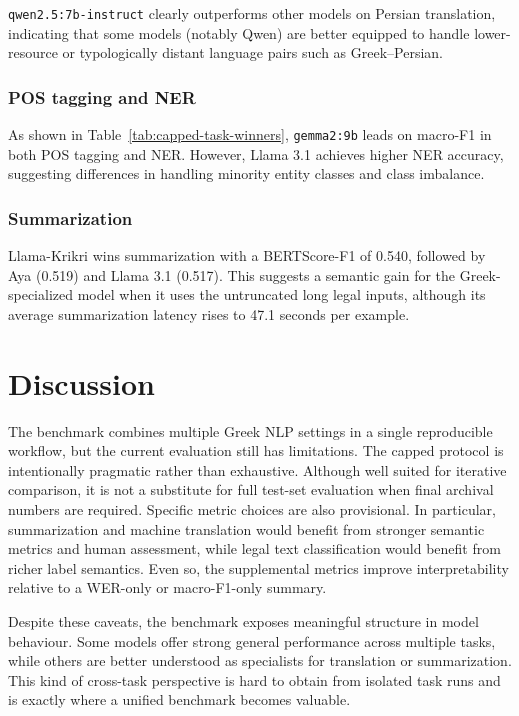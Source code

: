 \documentclass[sigconf,review,anonymous]{acmart}
\begin{document}
\texttt{qwen2.5:7b-instruct} clearly outperforms other models on Persian translation, indicating that some models (notably Qwen) are better equipped to handle lower-resource or typologically distant language pairs such as Greek–Persian.

\subsubsection{POS tagging and NER}
As shown in Table~\ref{tab:capped-task-winners}, \texttt{gemma2:9b} leads on macro-F1 in both POS tagging and NER. However, Llama 3.1 achieves higher NER accuracy, suggesting differences in handling minority entity classes and class imbalance.

\subsubsection{Summarization} Llama-Krikri wins summarization with a BERTScore-F1 of 0.540, followed by Aya (0.519) and Llama 3.1 (0.517). This suggests a semantic gain for the Greek-specialized model when it uses the untruncated long legal inputs, although its average summarization latency rises to 47.1 seconds per example.

\section{Discussion}
The benchmark combines multiple Greek NLP settings in a single reproducible workflow, but the current evaluation still has limitations. The capped protocol is intentionally pragmatic rather than exhaustive. Although well suited for iterative comparison, it is not a substitute for full test-set evaluation when final archival numbers are required. Specific metric choices are also provisional. In particular, summarization and machine translation would benefit from stronger semantic metrics and human assessment, while legal text classification would benefit from richer label semantics. Even so, the supplemental metrics improve interpretability relative to a WER-only or macro-F1-only summary.

Despite these caveats, the benchmark exposes meaningful structure in model behaviour. Some models offer strong general performance across multiple tasks, while others are better understood as specialists for translation or summarization. This kind of cross-task perspective is hard to obtain from isolated task runs and is exactly where a unified benchmark becomes valuable.
\end{document}
